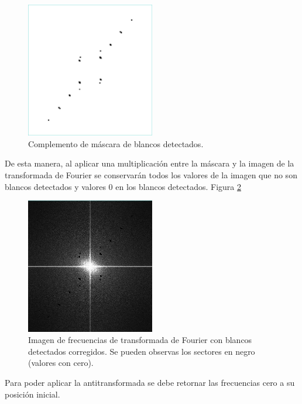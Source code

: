 \documentclass[10pt,a4paper, twoside]{report}
\newcounter{subsubsubsection}[subsubsection]
\begin{document}
\begin{figure}[H]
   \centering      
   \includegraphics[width=0.5\textwidth]{imagenes/maskFourierComplement.jpg}
 \caption{Complemento de máscara de blancos detectados.}
 \label{maskFourierComplement}
\end{figure}

De esta manera, al aplicar una multiplicación entre la máscara y la imagen de la transformada de Fourier se conservarán todos los valores de la imagen que no son blancos detectados y valores 0 en los blancos detectados. Figura \ref{fourierBlanksCorrected} 

\begin{figure}[H]
   \centering      
   \includegraphics[width=0.5\textwidth]{imagenes/fourierBlanksCorrected.jpg}
 \caption{Imagen de frecuencias de transformada de Fourier con blancos detectados corregidos. Se pueden observas los sectores en negro (valores con cero).}
 \label{fourierBlanksCorrected}
\end{figure}


Para poder aplicar la antitransformada se debe retornar las frecuencias cero a su posición inicial.
\end{document}
